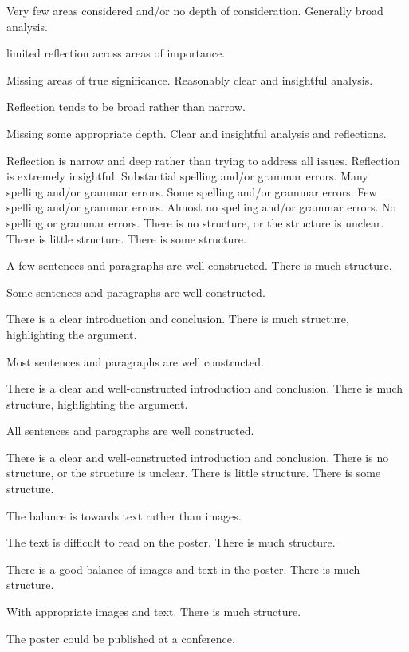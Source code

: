 \documentclass{../../fal_assignment}
\begin{document}
\begin{markingrubric}
	\par Very few areas considered and/or no depth of consideration.
	\grade 		Generally broad analysis.  
	\par limited reflection across areas of importance.
	\par Missing areas of true significance. 
	\grade 		Reasonably clear and insightful analysis.
	\par Reflection tends to be broad rather than narrow.
	\par Missing some appropriate depth. 
	\grade 		Clear and insightful analysis and reflections.
	\par Reflection is narrow and deep rather than trying to address all issues.
	\grade 		Reflection is extremely insightful.
	\grade\fail 	Substantial spelling and/or grammar errors.
	\grade 		Many spelling and/or grammar errors.
	\grade 		Some spelling and/or grammar errors.  
	\grade 		Few spelling and/or grammar errors.
	\grade 		Almost no spelling and/or grammar errors.
	\grade 		No spelling or grammar errors.
    \grade\fail 	There is no structure, or the structure is unclear.
	\grade 		There is little structure.
	\grade 		There is some structure.
	\par 		A few sentences and paragraphs are well constructed.
	\grade 		There is much structure.
	\par 		Some sentences and paragraphs are well constructed.
	\par 		There is a clear introduction and conclusion.
	\grade 		There is much structure, highlighting the argument.
	\par 		Most sentences and paragraphs are well constructed.
	\par 		There is a clear and well-constructed introduction and conclusion.
	\grade 		There is much structure, highlighting the argument.
	\par 		All sentences and paragraphs are well constructed.
	\par 		There is a clear and well-constructed introduction and conclusion.
	\grade\fail 	There is no structure, or the structure is unclear.
	\grade 		There is little structure.
	\grade 		There is some structure.
	\par 		The balance is towards text rather than images.
	\par		The text is difficult to read on the poster.
	\grade 		There is much structure.
	\par 		There is a good balance of images and text in the poster.
	\grade 		There is much structure.
	\par 		With appropriate images and text.
	\grade 		There is much structure.
	\par 		The poster could be published at a conference.
\end{markingrubric}
\end{document}

